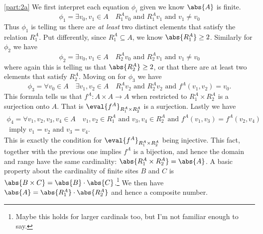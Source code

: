 \documentclass[boxes,pages,color=CornflowerBlue]{homework}
\begin{document}
\begin{solution}
    \ref{part:2a}
    We first interpret each equation $\phi_i$ given we know $\abs{A}$ is finite.
    \begin{equation*}
        \phi_1 = \exists v_0, v_1 \in A \quad R_1^Av_0 \text{ and } R_1^Av_1 \text{ and } v_1 \neq v_0
    \end{equation*}
    Thus $\phi_1$ is telling us there are \emph{at least} two distinct elements that satisfy the relation $R_1^A$.
    Put differently, since $R_1^A\subseteq A$, we know $\abs{R_1^A} \geq 2$.
    Similarly for $\phi_2$ we have
    \begin{equation*}
        \phi_2 = \exists v_0, v_1 \in A \quad R_2^Av_0 \text{ and } R_2^Av_1 \text{ and } v_1 \neq v_0
    \end{equation*}
    where again this is telling us that $\abs{R_2^A} \geq 2$, or that there are at least two elements that satisfy $R_2^A$.
    Moving on for $\phi_3$ we have
    \begin{equation*}
        \phi_3 = \forall v_0 \in A \quad \exists v_1, v_2 \in A \quad R_1^A v_2 \text{ and } R_2^A v_2 \text{ and } f^A(v_1, v_2) = v_0.
    \end{equation*}
    This formula tells us that $f^A: A\times A \to A$ when restricted to $R_1^A \times R_2^A$ is a surjection onto $A$.
    That is $\eval{f^A}_{R_1^A\times R_2^A}$ is a surjection.
    Lastly we have
    \begin{multline*}
        \phi_4 = \forall v_1, v_2, v_3, v_4 \in A \quad v_1, v_2 \in R_1^A \text{ and } v_3, v_4\in R_2^A \text{ and } f^A(v_1, v_3) = f^A(v_2, v_4) \\
        \text{ imply } v_1 = v_2 \text{ and } v_3 = v_4.
    \end{multline*}
    This is exactly the condition for $\eval{f^A}_{R_1^A\times R_2^A}$ being injective.
    This fact, together with the previous one implies $f^A$ is a bijection, and hence the domain and range have the same cardinality: $\abs{R_1^A\times R_2^A} = \abs{A}$.
    A basic property about the cardinality of finite sites $B$ and $C$ is $\abs{B\times C} = \abs{B}\cdot \abs{C}$.\footnote{Maybe this holds for larger cardinals too, but I'm not familiar enough to say.}
    We then have $\abs{A} = \abs{R_1^A}\cdot \abs{R_2^A}$ and hence a composite number.


\end{solution}
\end{document}
